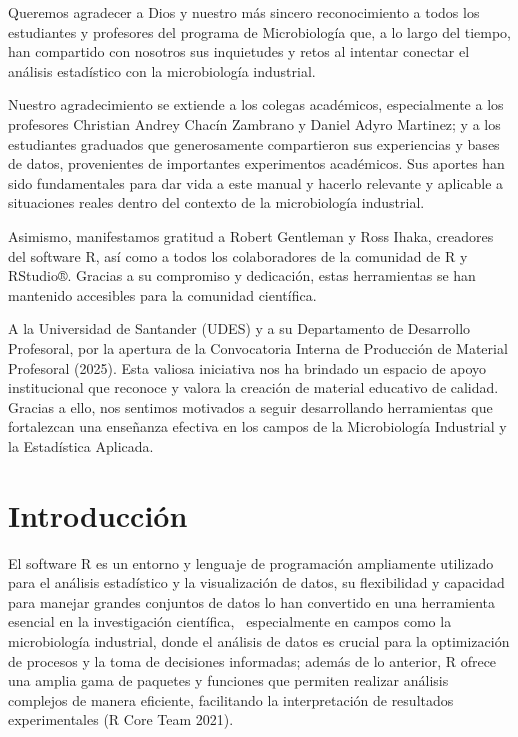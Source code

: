 \documentclass[
  letterpaper,
  DIV=11,
  numbers=noendperiod]{scrreprt}
\begin{document}

Queremos agradecer a Dios y nuestro más sincero reconocimiento a todos
los estudiantes y profesores del programa de Microbiología que, a lo
largo del tiempo, han compartido con nosotros sus inquietudes y retos al
intentar conectar el análisis estadístico con la microbiología
industrial.

Nuestro agradecimiento se extiende a los colegas académicos,
especialmente a los profesores Christian Andrey Chacín Zambrano y Daniel
Adyro Martinez; y a los estudiantes graduados que generosamente
compartieron sus experiencias y bases de datos, provenientes de
importantes experimentos académicos. Sus aportes han sido fundamentales
para dar vida a este manual y hacerlo relevante y aplicable a
situaciones reales dentro del contexto de la microbiología industrial.

Asimismo, manifestamos gratitud a Robert Gentleman y Ross Ihaka,
creadores del software R, así como a todos los colaboradores de la
comunidad de R y RStudio®. Gracias a su compromiso y dedicación, estas
herramientas se han mantenido accesibles para la comunidad científica.

A la Universidad de Santander (UDES) y a su Departamento de Desarrollo
Profesoral, por la apertura de la Convocatoria Interna de Producción de
Material Profesoral (2025). Esta valiosa iniciativa nos ha brindado un
espacio de apoyo institucional que reconoce y valora la creación de
material educativo de calidad. Gracias a ello, nos sentimos motivados a
seguir desarrollando herramientas que fortalezcan una enseñanza efectiva
en los campos de la Microbiología Industrial y la Estadística Aplicada.


\chapter{Introducción}\label{introducciuxf3n}

El software R es un entorno y lenguaje de programación ampliamente
utilizado para el análisis estadístico y la visualización de datos, su
flexibilidad y capacidad para manejar grandes conjuntos de datos lo han
convertido en una herramienta esencial en la investigación científica,~
especialmente en campos como la microbiología industrial, donde el
análisis de datos es crucial para la optimización de procesos y la toma
de decisiones informadas; además de lo anterior, R ofrece una amplia
gama de paquetes y funciones que permiten realizar análisis complejos de
manera eficiente, facilitando la interpretación de resultados
experimentales (R Core Team 2021).
\end{document}
